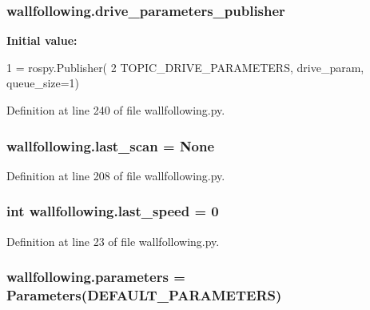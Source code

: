 \subsubsection[{\texorpdfstring{drive\+\_\+parameters\+\_\+publisher}{drive_parameters_publisher}}]{\setlength{\rightskip}{0pt plus 5cm}wallfollowing.\+drive\+\_\+parameters\+\_\+publisher}\hypertarget{namespacewallfollowing_aa69138defbbc5f21e99db50a6b3c903f}{}\label{namespacewallfollowing_aa69138defbbc5f21e99db50a6b3c903f}
{\bfseries Initial value\+:}
\begin{DoxyCode}
1 = rospy.Publisher(
2     TOPIC\_DRIVE\_PARAMETERS, drive\_param, queue\_size=1)
\end{DoxyCode}


Definition at line 240 of file wallfollowing.\+py.

\subsubsection[{\texorpdfstring{last\+\_\+scan}{last_scan}}]{\setlength{\rightskip}{0pt plus 5cm}wallfollowing.\+last\+\_\+scan = None}\hypertarget{namespacewallfollowing_ab6c7c8e53e8b1cd44872666515dd5764}{}\label{namespacewallfollowing_ab6c7c8e53e8b1cd44872666515dd5764}


Definition at line 208 of file wallfollowing.\+py.

\subsubsection[{\texorpdfstring{last\+\_\+speed}{last_speed}}]{\setlength{\rightskip}{0pt plus 5cm}int wallfollowing.\+last\+\_\+speed = 0}\hypertarget{namespacewallfollowing_a9ee8d77a4629b5d8ecb2899da6e3a7fe}{}\label{namespacewallfollowing_a9ee8d77a4629b5d8ecb2899da6e3a7fe}


Definition at line 23 of file wallfollowing.\+py.

\subsubsection[{\texorpdfstring{parameters}{parameters}}]{\setlength{\rightskip}{0pt plus 5cm}wallfollowing.\+parameters = {\bf Parameters}({\bf D\+E\+F\+A\+U\+L\+T\+\_\+\+P\+A\+R\+A\+M\+E\+T\+E\+RS})}\hypertarget{namespacewallfollowing_ae96254db0e391eed9862d0a6f636033e}{}\label{namespacewallfollowing_ae96254db0e391eed9862d0a6f636033e}


